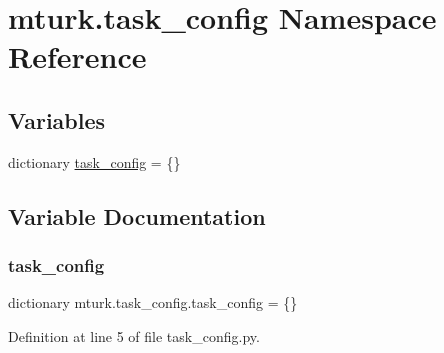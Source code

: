 \hypertarget{namespacemturk_1_1task__config}{}\section{mturk.\+task\+\_\+config Namespace Reference}
\label{namespacemturk_1_1task__config}
\subsection*{Variables}
\begin{DoxyCompactItemize}
\item 
dictionary \hyperlink{namespacemturk_1_1task__config_a834c07d689e4dd725f29241c6ea34e25}{task\+\_\+config} = \{\}
\end{DoxyCompactItemize}


\subsection{Variable Documentation}
\mbox{\label{namespacemturk_1_1task__config_a834c07d689e4dd725f29241c6ea34e25}} 
\subsubsection{\texorpdfstring{task\+\_\+config}{task\_config}}
{\footnotesize\ttfamily dictionary mturk.\+task\+\_\+config.\+task\+\_\+config = \{\}}



Definition at line 5 of file task\+\_\+config.\+py.

